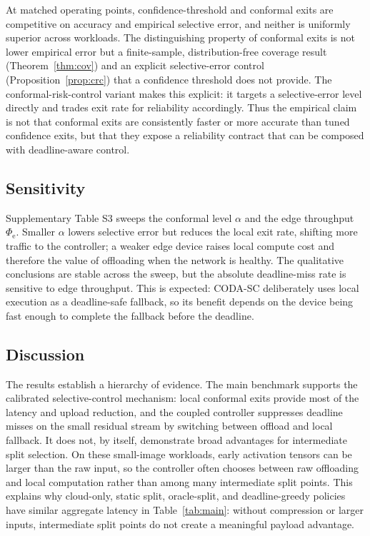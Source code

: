 \documentclass[11pt]{article}
\begin{document}
At matched operating points, confidence-threshold and conformal exits are
competitive on accuracy and empirical selective error, and neither is uniformly
superior across workloads. The distinguishing property of conformal exits is not lower
empirical error but a finite-sample, distribution-free coverage result
(Theorem~\ref{thm:cov}) and an explicit selective-error control
(Proposition~\ref{prop:crc}) that a confidence threshold does not provide. The
conformal-risk-control variant makes this explicit: it targets a selective-error
level directly and trades exit rate for reliability accordingly. Thus the
empirical claim is not that conformal exits are consistently faster or more
accurate than tuned confidence exits, but that they expose a reliability contract
that can be composed with deadline-aware control.

\subsection{Sensitivity}
\label{sec:sens}

Supplementary Table S3 sweeps the conformal level $\alpha$ and the edge
throughput $\Phi_{\mathrm{e}}$. Smaller $\alpha$ lowers selective error but
reduces the local exit rate, shifting more traffic to the controller; a weaker
edge device raises local compute cost and therefore the value of offloading when
the network is healthy. The qualitative conclusions are stable across the sweep,
but the absolute deadline-miss rate is sensitive to edge throughput. This is
expected: CODA-SC deliberately uses local execution as a deadline-safe fallback,
so its benefit depends on the device being fast enough to complete the fallback
before the deadline.

\subsection{Discussion}

The results establish a hierarchy of evidence. The main benchmark supports the
calibrated selective-control mechanism: local conformal exits provide most of
the latency and upload reduction, and the coupled controller suppresses deadline
misses on the small residual stream by switching between offload and local
fallback. It does not, by itself, demonstrate broad advantages for intermediate
split selection. On these small-image workloads, early activation tensors can be
larger than the raw input, so the controller often chooses between raw offloading
and local computation rather than among many intermediate split points. This
explains why cloud-only, static split, oracle-split, and deadline-greedy policies
have similar aggregate latency in Table~\ref{tab:main}: without compression or
larger inputs, intermediate split points do not create a meaningful payload
advantage.
\end{document}
